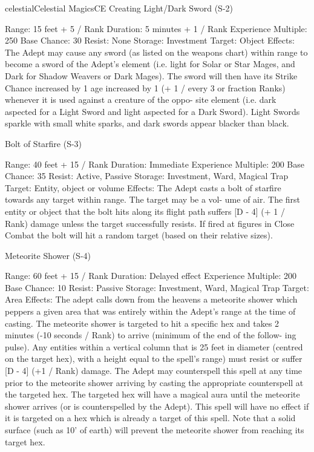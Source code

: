\begin{College}[1.3]{celestial}{Celestial Magics}{CE}
Creating Light/Dark Sword (S-2) 

Range: 15 feet + 5 / Rank 
Duration: 5 minutes + 1 / Rank 
Experience Multiple: 250 
Base Chance: 30%
Resist: None 
Storage: Investment 
Target: Object 
Effects: The Adept may cause any sword (as listed 
on  the  weapons  chart)  within  range  to  become  a 
sword of the Adept’s element (i.e. light for Solar or 
Star  Mages,  and  Dark  for  Shadow  Weavers  or 
Dark  Mages).  The  sword  will  then  have  its  Strike 
Chance increased by 1%
age increased by 1 (+ 1 / every 3 or fraction Ranks) 
whenever it is used against a creature of the oppo-
site  element  (i.e.  dark  aspected  for  a  Light  Sword 
and  light  aspected  for  a  Dark  Sword).  Light 
Swords  sparkle  with  small  white  sparks,  and  dark 
swords appear blacker than black. 

Bolt of Starfire (S-3) 

Range: 40 feet + 15 / Rank 
Duration: Immediate 
Experience Multiple: 200 
Base Chance: 35%
Resist: Active, Passive 
Storage: Investment, Ward, Magical Trap 
Target: Entity, object or volume 
Effects:  The  Adept  casts  a  bolt  of  starfire  towards 
any  target  within  range.  The  target  may  be  a  vol-
ume  of  air.  The  first  entity  or  object  that  the  bolt 
hits along its flight path suffers [D - 4] (+ 1 / Rank) 
damage  unless  the  target  successfully  resists.  If 
fired at figures in Close Combat the bolt will hit a 
random target (based on their relative sizes). 

Meteorite Shower (S-4) 

Range: 60 feet + 15 / Rank 
Duration: Delayed effect 
Experience Multiple: 200 
Base Chance: 10%
Resist: Passive 
Storage: Investment, Ward, Magical Trap 
Target: Area 
Effects:  The  adept  calls  down  from  the  heavens  a 
meteorite  shower  which  peppers  a  given  area  that 
was entirely within the Adept’s range at the time of 
casting.  The  meteorite  shower  is  targeted  to  hit  a 
specific  hex  and  takes  2  minutes  (-10  seconds  / 
Rank) to arrive (minimum of the end of the follow-
ing  pulse).  Any  entities  within  a  vertical  column 
that  is  25  feet  in  diameter  (centred  on  the  target 
hex), with a height equal to the spell’s range) must 
resist  or  suffer  [D  -  4]  (+1  /  Rank)  damage.  The 
Adept may counterspell this spell at any time prior 
to  the  meteorite  shower  arriving  by  casting  the 
appropriate  counterspell  at  the  targeted  hex.  The 
targeted  hex  will  have  a  magical  aura  until  the 
meteorite  shower  arrives  (or  is  counterspelled  by 
the  Adept).  This  spell  will  have  no  effect  if  it  is 
targeted  on  a  hex  which  is  already  a  target  of  this 
spell.  Note  that  a  solid  surface  (such  as  10’  of 
earth)  will  prevent  the  meteorite  shower  from 
reaching its target hex. 


\end{College}
